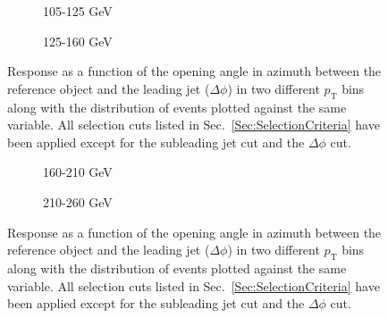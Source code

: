 \begin{figure}[!ht]
  \centering
  \begin{subfigure}{.5\textwidth}
    \centering
    \caption{105-125 GeV}
  \end{subfigure}%
  \begin{subfigure}{.5\textwidth}
    \centering
    \caption{125-160 GeV}
  \end{subfigure}
  \caption[Response as a function of the $\Delta\phi$ cut, 105-125and 125-160 GeV bins]
  {\small Response as a function of the opening angle in azimuth between the reference object and the leading jet ($\Delta\phi$) in two different $p_{\mathrm T}$ bins along with the distribution of events plotted against the same variable.  All selection cuts listed in Sec.~\ref{Sec:SelectionCriteria} have been applied except for the subleading jet cut and the $\Delta\phi$ cut.  }
  \label{plot:GJetEMdPhi105-125_2016App}
\end{figure}

\begin{figure}[!ht]
  \centering
  \begin{subfigure}{.5\textwidth}
    \centering
    \caption{160-210 GeV}
  \end{subfigure}%
  \begin{subfigure}{.5\textwidth}
    \centering
    \caption{210-260 GeV}
  \end{subfigure}
  \caption[Response as a function of the $\Delta\phi$ cut, 160-210 and 210-260 GeV bins]
  {\small Response as a function of the opening angle in azimuth between the reference object and the leading jet ($\Delta\phi$) in two different $p_{\mathrm T}$ bins along with the distribution of events plotted against the same variable.  All selection cuts listed in Sec.~\ref{Sec:SelectionCriteria} have been applied except for the subleading jet cut and the $\Delta\phi$ cut.  }
  \label{plot:GJetEMdPhi160-210_2016App}
\end{figure}

